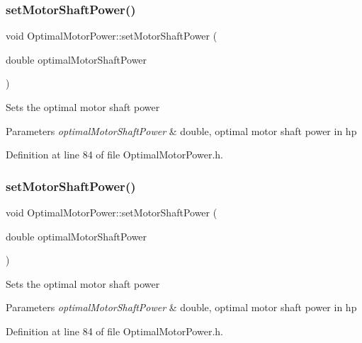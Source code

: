 \subsubsection{\texorpdfstring{set\+Motor\+Shaft\+Power()}{setMotorShaftPower()}\hspace{0.1cm}{\footnotesize\ttfamily [1/3]}}
{\footnotesize\ttfamily void Optimal\+Motor\+Power\+::set\+Motor\+Shaft\+Power (\begin{DoxyParamCaption}\item[{double}]{optimal\+Motor\+Shaft\+Power }\end{DoxyParamCaption})\hspace{0.3cm}{\ttfamily [inline]}}

Sets the optimal motor shaft power 
\begin{DoxyParams}{Parameters}
{\em optimal\+Motor\+Shaft\+Power} & double, optimal motor shaft power in hp \\
\hline
\end{DoxyParams}


Definition at line 84 of file Optimal\+Motor\+Power.\+h.

\mbox{\label{class_optimal_motor_power_ada8a9e3caac34c54470ad13ffe7edf53}} 
\subsubsection{\texorpdfstring{set\+Motor\+Shaft\+Power()}{setMotorShaftPower()}\hspace{0.1cm}{\footnotesize\ttfamily [2/3]}}
{\footnotesize\ttfamily void Optimal\+Motor\+Power\+::set\+Motor\+Shaft\+Power (\begin{DoxyParamCaption}\item[{double}]{optimal\+Motor\+Shaft\+Power }\end{DoxyParamCaption})\hspace{0.3cm}{\ttfamily [inline]}}

Sets the optimal motor shaft power 
\begin{DoxyParams}{Parameters}
{\em optimal\+Motor\+Shaft\+Power} & double, optimal motor shaft power in hp \\
\hline
\end{DoxyParams}


Definition at line 84 of file Optimal\+Motor\+Power.\+h.

